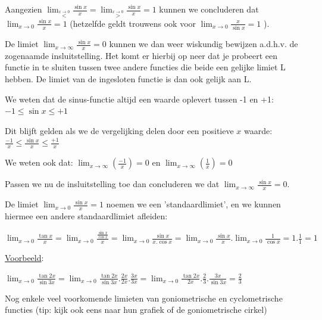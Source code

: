 Aangezien ${\displaystyle \lim_{\overset{x\rightarrow0}{<}}}\frac{\sin x}{x}={\displaystyle \lim_{\overset{x\rightarrow0}{>}}}\frac{\sin x}{x}=1$
kunnen we concluderen dat ${\displaystyle \lim_{x\rightarrow0}}\frac{\sin x}{x}=1$
(hetzelfde geldt trouwens ook voor ${\displaystyle \lim_{x\rightarrow0}}\frac{x}{\sin x}=1$
).


De limiet ${\displaystyle \lim_{x\rightarrow\infty}}\frac{\sin x}{x}=0$
kunnen we dan weer wiskundig bewijzen a.d.h.v. de zogenaamde insluitstelling.
Het komt er hierbij op neer dat je probeert een functie in te sluiten
tussen twee andere functies die beide een gelijke limiet L hebben.
De limiet van de ingesloten functie is dan ook gelijk aan L.




We weten dat de sinus-functie altijd een waarde oplevert
tussen -1 en +1: $-1\leq\sin x\leq+1$

Dit blijft gelden als we de vergelijking delen door een
positieve $x$ waarde: $\frac{-1}{x}\leq\frac{\sin x}{x}\leq\frac{+1}{x}$

We weten ook dat: ${\displaystyle \lim_{x\to\infty}}\left(\frac{-1}{x}\right)=0$
en ${\displaystyle \lim_{x\to\infty}}\left(\frac{1}{x}\right)=0$

Passen we nu de insluitstelling toe dan concluderen we dat
${\displaystyle \lim_{x\rightarrow\infty}}\frac{\sin x}{x}=0$.


De limiet ${\displaystyle \lim_{x\rightarrow0}}\frac{\sin x}{x}=1$
noemen we een 'standaardlimiet', en we kunnen hiermee een andere standaardlimiet
afleiden:

${\displaystyle \lim_{x\rightarrow0}}\frac{\tan x}{x}={\displaystyle \lim_{x\rightarrow0}}{\displaystyle \frac{\frac{\sin x}{\cos x}}{x}}={\displaystyle \lim_{x\rightarrow0}}\frac{\sin x}{x.\cos x}={\displaystyle \lim_{x\rightarrow0}}\frac{\sin x}{x}.{\displaystyle \lim_{x\rightarrow0}}\frac{1}{\cos x}=1.\frac{1}{1}=1$




\uline{Voorbeeld}:

${\displaystyle \lim_{x\rightarrow0}}\frac{\tan2x}{\sin3x}={\displaystyle \lim_{x\rightarrow0}}\frac{\tan2x}{\sin3x}.\frac{2x}{2x}.\frac{3x}{3x}={\displaystyle \lim_{x\rightarrow0}}\frac{\tan2x}{2x}.\frac{2}{3}.\frac{3x}{\sin3x}=\frac{2}{3}$




Nog enkele veel voorkomende limieten van goniometrische
en cyclometrische functies (tip: kijk ook eens naar hun grafiek of
de goniometrische cirkel)

